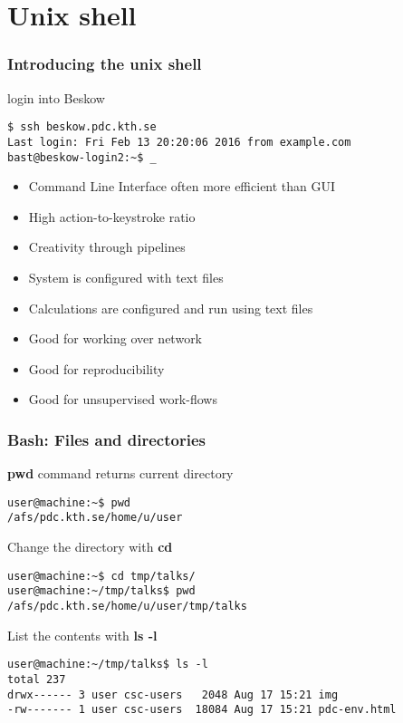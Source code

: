 \section*{Unix shell}
\begin{frame}[fragile]
  \frametitle{Introducing the unix shell}
  \begin{alertblock}{login into Beskow}
    \begin{verbatim}
$ ssh beskow.pdc.kth.se
Last login: Fri Feb 13 20:20:06 2016 from example.com
bast@beskow-login2:~$ _
    \end{verbatim}
  \end{alertblock}

  \begin{itemize}
  \item Command Line Interface often more efficient than GUI
  \item High action-to-keystroke ratio
  \item Creativity through pipelines
  \item System is configured with text files
  \item Calculations are configured and run using text files
  \item Good for working over network
  \item Good for reproducibility
  \item Good for unsupervised work-flows
  \end{itemize}
\end{frame}



\begin{frame}[fragile]
  \frametitle{Bash: Files and directories}
  \begin{exampleblock}{\alert{\textbf{pwd}} command returns current directory}
    \begin{verbatim}
user@machine:~$ pwd
/afs/pdc.kth.se/home/u/user
    \end{verbatim}
  \end{exampleblock}

   \begin{exampleblock}{Change the directory with \alert{\textbf{cd}}}
    \begin{verbatim}
user@machine:~$ cd tmp/talks/
user@machine:~/tmp/talks$ pwd
/afs/pdc.kth.se/home/u/user/tmp/talks
    \end{verbatim}
  \end{exampleblock}
  
    \begin{exampleblock}{List the contents with \alert{\textbf{ls -l}}}
    \begin{verbatim}
user@machine:~/tmp/talks$ ls -l
total 237
drwx------ 3 user csc-users   2048 Aug 17 15:21 img
-rw------- 1 user csc-users  18084 Aug 17 15:21 pdc-env.html
    \end{verbatim}
  \end{exampleblock}
\end{frame}

